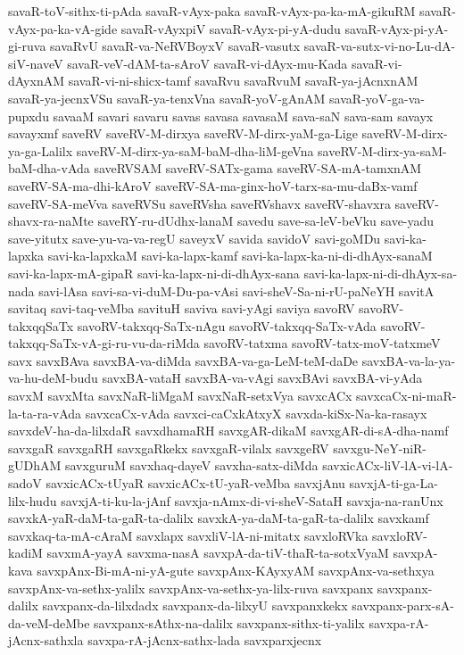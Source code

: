 {savaR-toV-sithx-ti-pAda
savaR-vAyx-paka
savaR-vAyx-pa-ka-mA-gikuRM
savaR-vAyx-pa-ka-vA-gide
savaR-vAyxpiV
savaR-vAyx-pi-yA-dudu
savaR-vAyx-pi-yA-gi-ruva
savaRvU
savaR-va-NeRVBoyxV
savaR-vasutx
savaR-va-sutx-vi-no-Lu-dA-siV-naveV
savaR-veV-dAM-ta-sAroV
savaR-vi-dAyx-mu-Kada
savaR-vi-dAyxnAM
savaR-vi-ni-shicx-tamf
savaRvu
savaRvuM
savaR-ya-jAcnxnAM
savaR-ya-jecnxVSu
savaR-ya-tenxVna
savaR-yoV-gAnAM
savaR-yoV-ga-va-pupxdu
savaaM
savari
savaru
savas
savasa
savasaM
sava-saN
sava-sam
savayx
savayxmf
saveRV
saveRV-M-dirxya
saveRV-M-dirx-yaM-ga-Lige
saveRV-M-dirx-ya-ga-Lalilx
saveRV-M-dirx-ya-saM-baM-dha-liM-geVna
saveRV-M-dirx-ya-saM-baM-dha-vAda
saveRVSAM
saveRV-SATx-gama
saveRV-SA-mA-tamxnAM
saveRV-SA-ma-dhi-kAroV
saveRV-SA-ma-ginx-hoV-tarx-sa-mu-daBx-vamf
saveRV-SA-meVva
saveRVSu
saveRVsha
saveRVshavx
saveRV-shavxra
saveRV-shavx-ra-naMte
saveRY-ru-dUdhx-lanaM
savedu
save-sa-leV-beVku
save-yadu
save-yitutx
save-yu-va-va-regU
saveyxV
savida
savidoV
savi-goMDu
savi-ka-lapxka
savi-ka-lapxkaM
savi-ka-lapx-kamf
savi-ka-lapx-ka-ni-di-dhAyx-sanaM
savi-ka-lapx-mA-gipaR
savi-ka-lapx-ni-di-dhAyx-sana
savi-ka-lapx-ni-di-dhAyx-sa-nada
savi-lAsa
savi-sa-vi-duM-Du-pa-vAsi
savi-sheV-Sa-ni-rU-paNeYH
savitA
savitaq
savi-taq-veMba
savituH
saviva
savi-yAgi
saviya
savoRV
savoRV-takxqqSaTx
savoRV-takxqq-SaTx-nAgu
savoRV-takxqq-SaTx-vAda
savoRV-takxqq-SaTx-vA-gi-ru-vu-da-riMda
savoRV-tatxma
savoRV-tatx-moV-tatxmeV
savx
savxBAva
savxBA-va-diMda
savxBA-va-ga-LeM-teM-daDe
savxBA-va-la-ya-va-hu-deM-budu
savxBA-vataH
savxBA-va-vAgi
savxBAvi
savxBA-vi-yAda
savxM
savxMta
savxNaR-liMgaM
savxNaR-setxVya
savxcACx
savxcaCx-ni-maR-la-ta-ra-vAda
savxcaCx-vAda
savxci-caCxkAtxyX
savxda-kiSx-Na-ka-rasayx
savxdeV-ha-da-lilxdaR
savxdhamaRH
savxgAR-dikaM
savxgAR-di-sA-dha-namf
savxgaR
savxgaRH
savxgaRkekx
savxgaR-vilalx
savxgeRV
savxgu-NeY-niR-gUDhAM
savxguruM
savxhaq-dayeV
savxha-satx-diMda
savxicACx-liV-lA-vi-lA-sadoV
savxicACx-tUyaR
savxicACx-tU-yaR-veMba
savxjAnu
savxjA-ti-ga-La-lilx-hudu
savxjA-ti-ku-la-jAnf
savxja-nAmx-di-vi-sheV-SataH
savxja-na-ranUnx
savxkA-yaR-daM-ta-gaR-ta-dalilx
savxkA-ya-daM-ta-gaR-ta-dalilx
savxkamf
savxkaq-ta-mA-cAraM
savxlapx
savxliV-lA-ni-mitatx
savxloRVka
savxloRV-kadiM
savxmA-yayA
savxma-nasA
savxpA-da-tiV-thaR-ta-sotxVyaM
savxpA-kava
savxpAnx-Bi-mA-ni-yA-gute
savxpAnx-KAyxyAM
savxpAnx-va-sethxya
savxpAnx-va-sethx-yalilx
savxpAnx-va-sethx-ya-lilx-ruva
savxpanx
savxpanx-dalilx
savxpanx-da-lilxdadx
savxpanx-da-lilxyU
savxpanxkekx
savxpanx-parx-sA-da-veM-deMbe
savxpanx-sAthx-na-dalilx
savxpanx-sithx-ti-yalilx
savxpa-rA-jAcnx-sathxla
savxpa-rA-jAcnx-sathx-lada
savxparxjecnx
}
